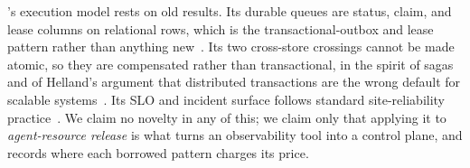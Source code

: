 \sys's execution model rests on old results. Its durable queues are status,
claim, and lease columns on relational rows, which is the transactional-outbox and
lease pattern rather than anything new~\cite{gray1981transaction,kleppmann2017ddia}.
Its two cross-store crossings cannot be made atomic, so they are compensated
rather than transactional, in the spirit of sagas~\cite{garciamolina1987sagas} and
of Helland's argument that distributed transactions are the wrong default for
scalable systems~\cite{helland2007apostates}. Its SLO and incident surface follows
standard site-reliability practice~\cite{beyer2016sre}. We claim no novelty in any
of this; we claim only that applying it to \emph{agent-resource release} is what
turns an observability tool into a control plane, and  records
where each borrowed pattern charges its price.
